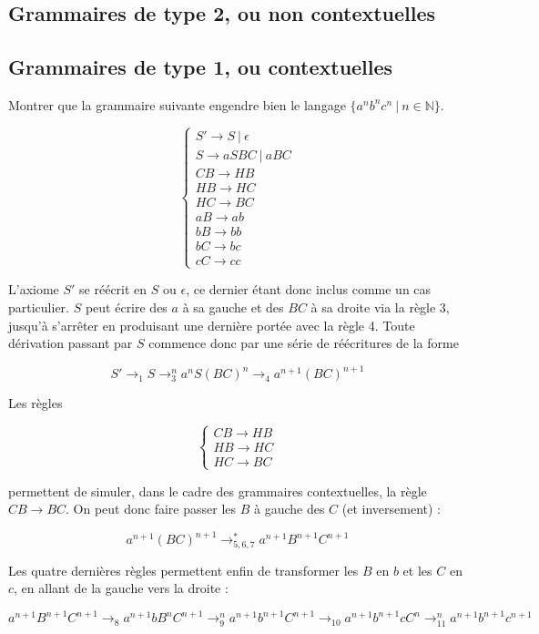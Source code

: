 \subsection{Grammaires de type 2, ou non contextuelles}


\subsection{Grammaires de type 1, ou contextuelles}


\begin{exercice}
Montrer que la grammaire suivante engendre bien le langage \newline $\{a^nb^nc^n ~|~ n \in \mathbb{N}\}$.

\[
\begin{cases}
S' \rightarrow S~|~\epsilon\\
S \rightarrow aSBC~|~aBC \\
CB \rightarrow HB\\
HB \rightarrow HC \\
HC \rightarrow BC \\
aB \rightarrow ab \\
bB \rightarrow bb \\
bC \rightarrow bc \\
cC \rightarrow cc 
\end{cases}
\]

\end{exercice}


\begin{correction*}

L'axiome $S'$ se réécrit en $S$ ou $\epsilon$, ce dernier étant donc inclus comme un cas particulier. $S$ peut écrire des $a$ à sa gauche et des $BC$ à sa droite via la règle 3, jusqu'à s'arrêter en produisant une dernière portée avec la règle 4. Toute dérivation passant par $S$ commence donc par une série de réécritures de la forme 

\[
S' \rightarrow_1 S \rightarrow_3^n a^nS(BC)^n \rightarrow_4 a^{n+1}(BC)^{n+1}
\]

Les règles 

\[
\begin{cases}
CB \rightarrow HB\\
HB \rightarrow HC \\
HC \rightarrow BC
\end{cases}
\]

permettent de simuler, dans le cadre des grammaires contextuelles, la règle $CB \rightarrow BC$. On peut donc faire passer les $B$ à gauche des $C$ (et inversement) :

\[
a^{n+1}(BC)^{n+1} \rightarrow_{5, 6, 7}^* a^{n+1}B^{n+1}C^{n+1}
\]

Les quatre dernières règles permettent enfin de transformer les $B$ en $b$ et les $C$ en $c$, en allant de la gauche vers la droite :

\[
a^{n+1}B^{n+1}C^{n+1} \rightarrow_8 a^{n+1}bB^{n}C^{n+1} \rightarrow_9^n a^{n+1}b^{n+1}C^{n+1} \rightarrow_{10} a^{n+1}b^{n+1}cC^{n} \rightarrow_{11}^n a^{n+1}b^{n+1}c^{n+1}
\]


\end{correction*}


